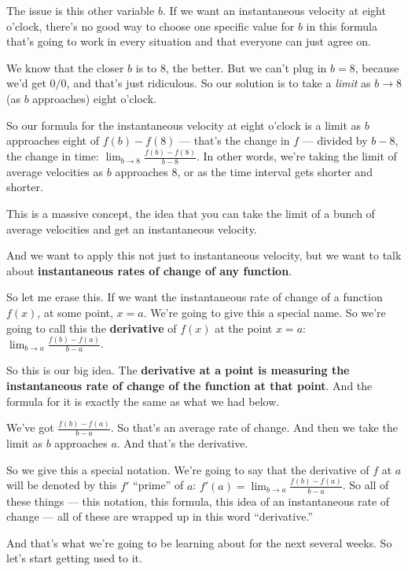 \documentclass[pdftex, brazil, 12pt, twoside]{article}
\begin{document}
The issue is this other variable $b$.
If we want an instantaneous velocity at eight o'clock,
there's no good way to choose one specific value
for $b$ in this formula that's going
to work in every situation and that everyone can just
agree on.

We know that the closer $b$ is to 8, the better.
But we can't plug in $b = 8$,
because we'd get $0/0$, and that's just ridiculous.
So our solution is to take a \emph{limit}
as $b \to 8$ (as $b$ approaches) eight o'clock.

So our formula for the instantaneous velocity
at eight o'clock is a limit as $b$ approaches
eight of $f(b) - f(8)$ --- that's
the change in $f$ --- divided by $b - 8$, the change in time:
$\displaystyle \lim_{b \to 8}\frac{f(b)-f(8)}{b-8}$.
In other words, we're taking the limit of average velocities
as $b$ approaches 8, or as the time interval gets
shorter and shorter.

This is a massive concept, the idea
that you can take the limit of a bunch of average velocities
and get an instantaneous velocity.

And we want to apply this not just to instantaneous velocity,
but we want to talk about \textbf{instantaneous rates of change
of any function}.

So let me erase this.
If we want the instantaneous rate of change of a function
$f(x)$, at some point, $x = a$.
We're going to give this a special name.
So we're going to call this the \textbf{derivative} of $f(x)$
at the point $x = a$: $\displaystyle \lim_{b \to a}\frac{f(b)-f(a)}{b-a}$.

So this is our big idea.
The \textbf{derivative at a point is measuring
the instantaneous rate of change of the function at that point}.
And the formula for it is exactly the same
as what we had below.

We've got $\displaystyle \frac{f(b) - f(a)}{b - a}$.
So that's an average rate of change.
And then we take the limit as $b$ approaches $a$.
And that's the derivative.

So we give this a special notation.
We're going to say that the derivative of $f$ at $a$
will be denoted by this $f'$ ``prime'' of $a$:
$\displaystyle f'(a) = \lim_{b \to a}\frac{f(b)-f(a)}{b-a}$.
So all of these things --- this notation,
this formula, this idea of an instantaneous rate of change ---
all of these are wrapped up in this word ``derivative.''

And that's what we're going to be
learning about for the next several weeks.
So let's start getting used to it.
\end{document}
